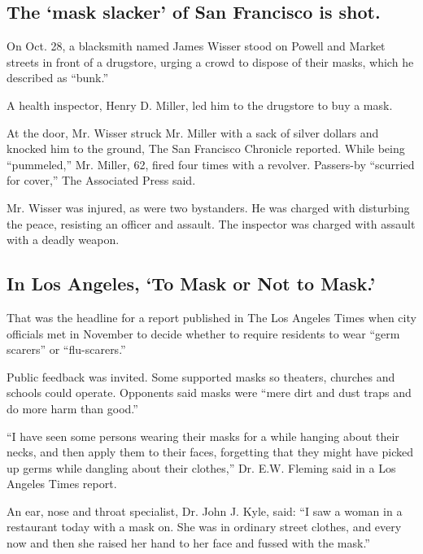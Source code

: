\hypertarget{the-mask-slacker-of-san-francisco-is-shot}{%
\subsection{The `mask slacker' of San Francisco is
shot.}\label{the-mask-slacker-of-san-francisco-is-shot}}

On Oct. 28, a blacksmith named James Wisser stood on Powell and Market
streets in front of a drugstore, urging a crowd to dispose of their
masks, which he described as ``bunk.''

A health inspector, Henry D. Miller, led him to the drugstore to buy a
mask.

At the door, Mr. Wisser struck Mr. Miller with a sack of silver dollars
and knocked him to the ground, The San Francisco Chronicle reported.
While being ``pummeled,'' Mr. Miller, 62, fired four times with a
revolver. Passers-by ``scurried for cover,'' The Associated Press said.

Mr. Wisser was injured, as were two bystanders. He was charged with
disturbing the peace, resisting an officer and assault. The inspector
was charged with assault with a deadly weapon.

\hypertarget{in-los-angeles-to-mask-or-not-to-mask}{%
\subsection{In Los Angeles, `To Mask or Not to
Mask.'}\label{in-los-angeles-to-mask-or-not-to-mask}}

That was the headline for a report published in The Los Angeles Times
when city officials met in November to decide whether to require
residents to wear ``germ scarers'' or ``flu-scarers.''

Public feedback was invited. Some supported masks so theaters, churches
and schools could operate. Opponents said masks were ``mere dirt and
dust traps and do more harm than good.''

``I have seen some persons wearing their masks for a while hanging about
their necks, and then apply them to their faces, forgetting that they
might have picked up germs while dangling about their clothes,'' Dr.
E.W. Fleming said in a Los Angeles Times report.

An ear, nose and throat specialist, Dr. John J. Kyle, said: ``I saw a
woman in a restaurant today with a mask on. She was in ordinary street
clothes, and every now and then she raised her hand to her face and
fussed with the mask.''

